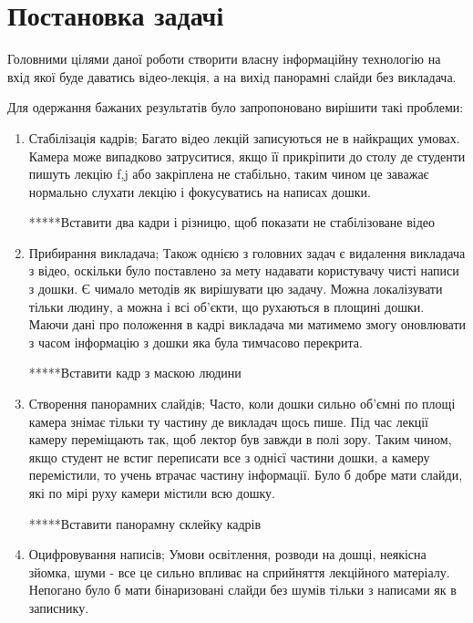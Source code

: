 \section{Постановка задачі}

Головними цілями даної роботи створити власну інформаційну технологію
на вхід якої буде даватись відео-лекція, а на вихід панорамні слайди
без викладача.

Для одержання бажаних результатів було запропоновано
вирішити такі проблеми:
\begin{enumerate}
	\item Стабілізація кадрів;
	      Багато відео лекцій записуються не в найкращих умовах.
	      Камера може випадково затруситися, якщо її прикріпити до столу
	      де студенти пишуть лекцію f,j або закріплена не стабільно, таким чином
	      це заважає нормально слухати лекцію і фокусуватись на написах дошки.
	      
	      *****Вставити  два кадри і різницю, щоб показати не стабілізоване відео
	      
	\item Прибирання викладача;
	      Також однією з головних задач є видалення викладача з відео, оскільки
	      було поставлено за мету надавати користувачу чисті написи з дошки.
	      Є чимало методів як вирішувати цю задачу. Можна локалізувати тільки
	      людину, а можна і всі об'єкти, що рухаються в площині дошки. Маючи
	      дані про положення в кадрі викладача ми матимемо змогу оновлювати
	      з часом інформацію з дошки яка була тимчасово перекрита.
	      
	      *****Вставити кадр з маскою людини
	      
	\item Створення панорамних слайдів;
	      Часто, коли дошки сильно об'ємні по площі камера знімає тільки ту частину де
	      викладач щось пише. Під час лекції камеру переміщають так, щоб лектор був завжди
	      в полі зору. Таким чином, якщо студент не встиг переписати все з однієї частини
	      дошки, а камеру перемістили, то учень втрачає частину інформації. Було б добре
	      мати слайди, які по мірі руху камери містили всю дошку.
	      
	      *****Вставити панорамну склейку кадрів
	      
	\item Оцифровування написів;
	      Умови освітлення, розводи на дошці, неякісна зйомка, шуми - все це сильно впливає
	      на сприйняття лекційного матеріалу. Непогано було б мати бінаризовані слайди без
	      шумів тільки з написами як в записнику.
	      
\end{enumerate}


